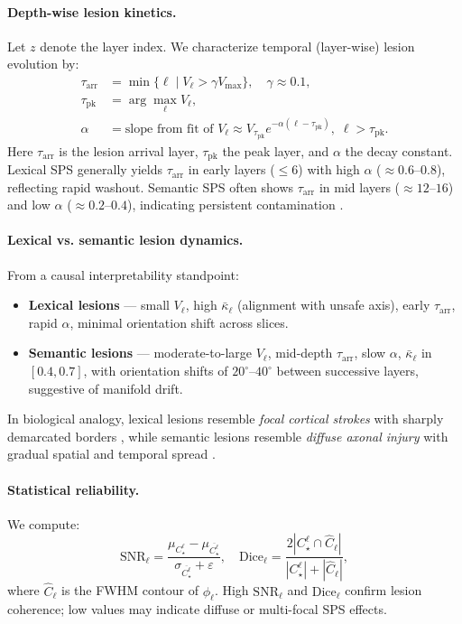 \documentclass[11pt]{article}
\begin{document}
\paragraph{Depth-wise lesion kinetics.}
Let $z$ denote the layer index. We characterize temporal (layer-wise) lesion evolution by:
\begin{align*}
\tau_{\mathrm{arr}} &= \min \{\ell \;|\; V_\ell > \gamma V_{\max} \}, \quad \gamma \approx 0.1, \\
\tau_{\mathrm{pk}} &= \arg\max_\ell V_\ell, \\
\alpha &= \text{slope from fit of } V_\ell \approx V_{\tau_{\mathrm{pk}}} e^{-\alpha(\ell - \tau_{\mathrm{pk}})}, \; \ell > \tau_{\mathrm{pk}}.
\end{align*}
Here $\tau_{\mathrm{arr}}$ is the lesion arrival layer, $\tau_{\mathrm{pk}}$ the peak layer, and $\alpha$ the decay constant.  
Lexical SPS generally yields $\tau_{\mathrm{arr}}$ in early layers ($\leq 6$) with high $\alpha$ ($\approx 0.6$–$0.8$), reflecting rapid washout.  
Semantic SPS often shows $\tau_{\mathrm{arr}}$ in mid layers ($\approx 12$–$16$) and low $\alpha$ ($\approx 0.2$–$0.4$), indicating persistent contamination \citep{elhage2021mathematical, meng2022locating}.

\paragraph{Lexical vs. semantic lesion dynamics.}
From a causal interpretability standpoint:
\begin{itemize}
    \item \textbf{Lexical lesions} — small $V_\ell$, high $\bar{\kappa}_\ell$ (alignment with unsafe axis), early $\tau_{\mathrm{arr}}$, rapid $\alpha$, minimal orientation shift across slices.
    \item \textbf{Semantic lesions} — moderate-to-large $V_\ell$, mid-depth $\tau_{\mathrm{arr}}$, slow $\alpha$, $\bar{\kappa}_\ell$ in $[0.4,0.7]$, with orientation shifts of $20^\circ$–$40^\circ$ between successive layers, suggestive of manifold drift.
\end{itemize}
In biological analogy, lexical lesions resemble \emph{focal cortical strokes} with sharply demarcated borders \citep{fisher1991lacunar}, while semantic lesions resemble \emph{diffuse axonal injury} with gradual spatial and temporal spread \citep{gennarelli1982diffuse}.

\paragraph{Statistical reliability.}
We compute:
\[
\mathrm{SNR}_\ell = \frac{\mu_{C_\star^\ell} - \mu_{\overline{C_\star^\ell}}}{\sigma_{\overline{C_\star^\ell}} + \varepsilon}, \quad
\mathrm{Dice}_\ell = \frac{2 |C_\star^\ell \cap \widehat{C}_\ell|}{|C_\star^\ell| + |\widehat{C}_\ell|},
\]
where $\widehat{C}_\ell$ is the FWHM contour of $\phi_\ell$.  
High $\mathrm{SNR}_\ell$ and $\mathrm{Dice}_\ell$ confirm lesion coherence; low values may indicate diffuse or multi-focal SPS effects.
\end{document}
